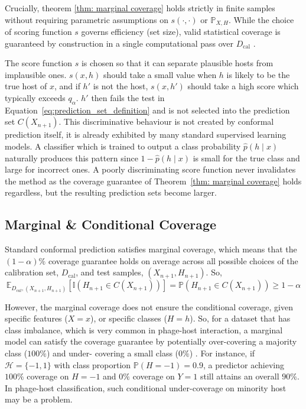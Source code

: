 Crucially, theorem \ref{thm: marginal coverage} holds strictly in finite samples without requiring parametric 
assumptions on $s(\cdot, \cdot)$ or $\mathbb{P}_{X,H}$. While the choice of scoring function $s$ governs efficiency (set 
size), valid statistical coverage is guaranteed by construction in a single computational pass over $D_{\text{cal}}$ 
\cite{ochoarivera2024conformal}.

The score function $s$ is chosen so that it can separate plausible hosts from implausible ones. $s(x,h)$ should take a 
small value when $h$ is likely to be the true host of $x$, and if $h'$ is not the host, $s(x, h')$ should take a high
score which typically exceeds $q_{\alpha}$. $h'$ then fails the test in Equation~\ref{eq:prediction_set_definition} 
and is not selected into the prediction set $C(X_{n+1})$. This discriminative behaviour is not created by conformal 
prediction itself, it is already exhibited by many standard supervised learning models. A classifier which is trained to
output a class probability $\hat p(h \mid x)$ naturally produces this pattern since $1-\hat p(h\mid x)$ is
small for the true class and large for incorrect ones. A poorly discriminating score function never invalidates the 
method as the coverage guarantee of Theorem~\ref{thm: marginal coverage} holds regardless, but the resulting prediction 
sets become larger. 


\subsection{Marginal \& Conditional Coverage}
\label{sec2.3.3: coverage types}
Standard conformal prediction satisfies marginal coverage, which means that the $(1-\alpha)\%$ coverage guarantee 
holds on average across all possible choices of the calibration set, $D_{\text{cal}}$, and test samples, $(X_{n+1}, 
H_{n+1})$. So, 
$$\mathbb{E}_{D_{cal}, (X_{n+1}, H_{n+1})} \left[ \mathbb{I}(H_{n+1} \in C(X_{n+1})) \right] = \mathbb{P}(H_{n+1} \in 
C(X_{n+1})) \geq 1 - \alpha$$

However, the marginal coverage does not ensure the conditional coverage, given specific features ($X = x$), or 
specific classes ($H=h$). So, for a dataset that has class imbalance, which is very common in phage-host interaction, a 
marginal model can satisfy the coverage guarantee by potentially over-covering a majority class ($100\%$) and under-
covering a small class ($0\%$) \cite{ochoarivera2024conformal, romano2020classification}. For instance, if $\mathcal{H} 
= \{-1, 1\}$ with class proportion $\mathbb{P}(H = -1) = 0.9$, a predictor achieving $100\%$ coverage on $H = -1$ and 
$0\%$ coverage on $Y = 1$ still attains an overall $90\%$. In phage-host classification, such conditional under-coverage 
on minority host may be a problem. 
 
